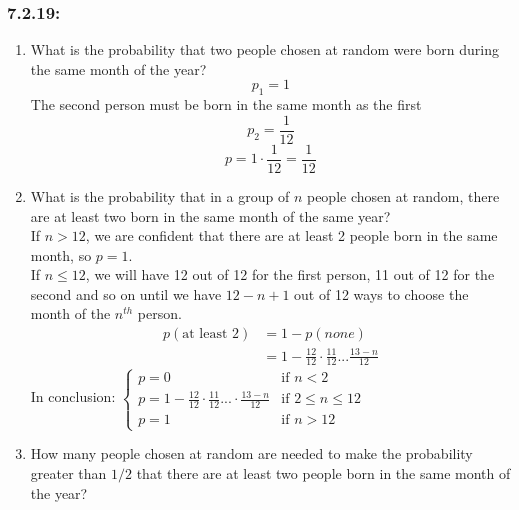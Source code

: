 \documentclass[a4paper]{article}
\begin{document}
\subsubsection*{7.2.19:}
\begin{enumerate}[label=\alph*)]
	\item What is the probability that two people chosen at random were born during the same month of the year?
	      \begin{equation*}
		      p_1 = 1
	      \end{equation*}
	      The second person must be born in the same month as the first
	      \begin{equation*}
		      p_2 = \frac{1}{12}
	      \end{equation*}
	      \begin{equation*}
		      p = 1\cdot\frac{1}{12}=\frac{1}{12}
	      \end{equation*}
	\item What is the probability that in a group of $n$ people chosen at random, there are at least two born in the same month of the same year? \\
	      If $n>12$, we are confident that there are at least 2 people born in the same month, so $p=1$. \\
	      If $n\leq12$, we will have 12 out of 12 for the first person, 11 out of 12 for the second and so on until we have $12-n+1$ out of 12 ways to choose the month of the $n^{th}$ person.
	      \begin{align*}
		      p(\text{at least 2}) & = 1 - p(none)                                          \\
		                           & = 1-\frac{12}{12}\cdot \frac{11}{12}...\frac{13-n}{12}
	      \end{align*}
	      In conclusion:
	      $\begin{cases}
			      p=0                                                            & \text{if } n<2           \\
			      p = 1-\frac{12}{12}\cdot \frac{11}{12}...\cdot \frac{13-n}{12} & \text{if } 2\leq n\leq12 \\
			      p = 1                                                          & \text{if } n>12
		      \end{cases}$
	\item How many people chosen at random are needed to make the probability greater than $1/2$ that there are at least two people born in the same month of the year? \\

\end{enumerate}
\end{document}
